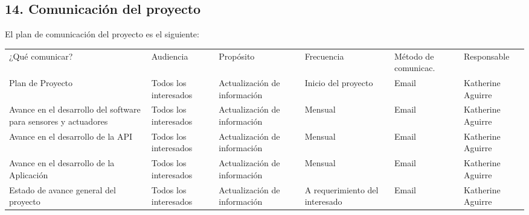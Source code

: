 \documentclass[11pt]{charter}
\begin{document}
\begin{landscape}
\section{14. Comunicación del proyecto}
\label{sec:comunicaciones}

El plan de comunicación del proyecto es el siguiente:

\begin{tabularx}{\linewidth}{@{}|p{6.8cm}|p{4cm}|p{4cm}|p{4cm}|p{2cm}|p{2cm}|@{}}
\hline
\rowcolor[HTML]{418ddc} 
\multicolumn{6}{|c|}{\cellcolor[HTML]{418ddc}PLAN DE COMUNICACIÓN DEL PROYECTO}           \\ \hline
\rowcolor[HTML]{418ddc} 
¿Qué   comunicar?                                                 & Audiencia             & Propósito                                                & Frecuencia                     & Método de comunicac. & Responsable       \\
Plan de   Proyecto                                                & Todos los interesados & Actualización de información                             & Inicio del proyecto            & Email                & Katherine Aguirre \\
Avance   en el desarrollo del software para sensores y actuadores & Todos los interesados & Actualización de información                             & Mensual                        & Email                & Katherine Aguirre \\
Avance   en el desarrollo de la API                               & Todos los interesados & Actualización de información                             & Mensual                        & Email                & Katherine Aguirre \\
Avance   en el desarrollo de la Aplicación                        & Todos los interesados & Actualización de información                             & Mensual                        & Email                & Katherine Aguirre \\
Estado   de avance general del proyecto                           & Todos los interesados & Actualización de información                             & A requerimiento del interesado & Email                & Katherine Aguirre \\

\end{tabularx}
\end{landscape}
\end{document}
